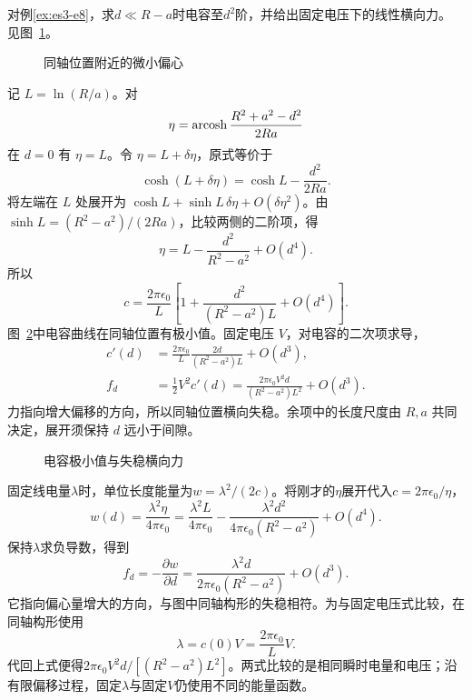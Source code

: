 \begin{exercise}[偏心圆柱的微小偏移]\label{ex:es3-h8}
对例\ref{ex:es3-e8}，求$d\ll R-a$时电容至$d^2$阶，并给出固定电压下的线性横向力。 见图~\ref{fig:es3-h8-q}。
\end{exercise}

\begin{figure}[H]\centering
{}
\caption{同轴位置附近的微小偏心}\label{fig:es3-h8-q}
\end{figure}
\begin{solution}
记 $L=\ln(R/a)$。对
\[\eta=\operatorname{arcosh}\frac{R^2+a^2-d^2}{2Ra}\]
在 $d=0$ 有 $\eta=L$。令 $\eta=L+\delta\eta$，原式等价于
\[\cosh(L+\delta\eta)=\cosh L-\frac{d^2}{2Ra}.\]
将左端在 $L$ 处展开为 $\cosh L+\sinh L\,\delta\eta+O(\delta\eta^2)$。由 $\sinh L=(R^2-a^2)/(2Ra)$，比较两侧的二阶项，得
\[\eta=L-\frac{d^2}{R^2-a^2}+O(d^4).\]
所以
\[c=\frac{2\pi\epsilon_0}{L}\left[1+\frac{d^2}{(R^2-a^2)L}+O(d^4)\right].\]
图~\ref{fig:es3-h8-s}中电容曲线在同轴位置有极小值。固定电压 $V$，对电容的二次项求导，
\[\begin{aligned}
c'(d)&=\frac{2\pi\epsilon_0}{L}\frac{2d}{(R^2-a^2)L}+O(d^3),\\
f_d&=\frac12V^2c'(d)=\frac{2\pi\epsilon_0V^2d}{(R^2-a^2)L^2}+O(d^3).
\end{aligned}\]
力指向增大偏移的方向，所以同轴位置横向失稳。余项中的长度尺度由 $R,a$ 共同决定，展开须保持 $d$ 远小于间隙。
\begin{figure}[H]\centering
{}
\caption{电容极小值与失稳横向力}\label{fig:es3-h8-s}
\end{figure}


固定线电量$\lambda$时，单位长度能量为$w=\lambda^2/(2c)$。将刚才的$\eta$展开代入$c=2\pi\epsilon_0/\eta$，
\[w(d)=\frac{\lambda^2\eta}{4\pi\epsilon_0}
=\frac{\lambda^2L}{4\pi\epsilon_0}
-\frac{\lambda^2d^2}{4\pi\epsilon_0(R^2-a^2)}+O(d^4).
\]
保持$\lambda$求负导数，得到
\[f_d=-\frac{\partial w}{\partial d}
=\frac{\lambda^2d}{2\pi\epsilon_0(R^2-a^2)}+O(d^3).
\]
它指向偏心量增大的方向，与图中同轴构形的失稳相符。为与固定电压式比较，在同轴构形使用
\[\lambda=c(0)V=\frac{2\pi\epsilon_0}{L}V.
\]
代回上式便得$2\pi\epsilon_0V^2d/[(R^2-a^2)L^2]$。两式比较的是相同瞬时电量和电压；沿有限偏移过程，固定$\lambda$与固定$V$仍使用不同的能量函数。\end{solution}

